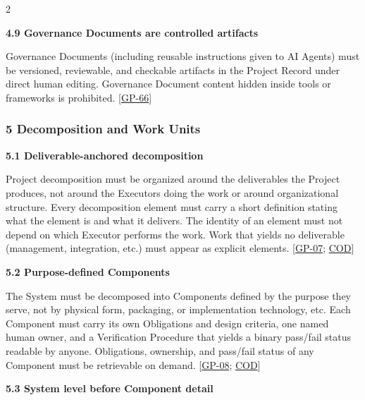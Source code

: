 \begin{multicols}{2}
\hypertarget{nss-4.9}{}

\par\smallskip\noindent\textbf{4.9 Governance Documents are controlled artifacts}\par\nopagebreak

Governance Documents (including reusable instructions given to AI Agents) must be versioned, reviewable, and checkable artifacts in the Project Record under direct human editing. Governance Document content hidden inside tools or frameworks is prohibited. [\hyperlink{gp-66}{GP-66}]

\hypertarget{nss-5}{}

\subsubsection*{5 Decomposition and Work Units}

\hypertarget{nss-5.1}{}

\par\smallskip\noindent\textbf{5.1 Deliverable-anchored decomposition}\par\nopagebreak

Project decomposition must be organized around the deliverables the Project produces, not around the Executors doing the work or around organizational structure. Every decomposition element must carry a short definition stating what the element is and what it delivers. The identity of an element must not depend on which Executor performs the work. Work that yields no deliverable (management, integration, etc.) must appear as explicit elements. [\hyperlink{gp-07}{GP-07}; \hyperlink{gp-COD}{COD}]

\hypertarget{nss-5.2}{}

\par\smallskip\noindent\textbf{5.2 Purpose-defined Components}\par\nopagebreak

The System must be decomposed into Components defined by the purpose they serve, not by physical form, packaging, or implementation technology, etc. Each Component must carry its own Obligations and design criteria, one named human owner, and a Verification Procedure that yields a binary pass/fail status readable by anyone. Obligations, ownership, and pass/fail status of any Component must be retrievable on demand. [\hyperlink{gp-08}{GP-08}; \hyperlink{gp-COD}{COD}]

\hypertarget{nss-5.3}{}

\par\smallskip\noindent\textbf{5.3 System level before Component detail}\par\nopagebreak


\end{multicols}

